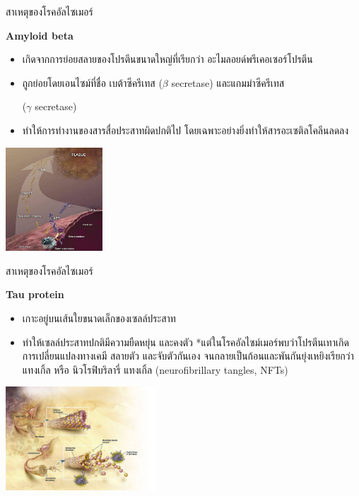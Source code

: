 \documentclass[xetex,serif]{beamer}
\begin{document}
\begin{frame}{สาเหตุของโรคอัลไซเมอร์}

  {\large \textbf{Amyloid beta}}

  \begin{itemize}
    \item เกิดจากการย่อยสลายของโปรตีนขนาดใหญ่ที่เรียกว่า อะไมลอยด์พรีเคอเซอร์โปรตีน
    \item ถูกย่อยโดยเอนไซม์ที่ชื่อ เบต้าซีครีเทส ($\beta$ secretase) และแกมม่าซีครีเทส
    
    ($\gamma$ secretase)
    \item ทำให้การทำงานของสารสื่อประสาทผิดปกติไป โดยเฉพาะอย่างยิ่งทำให้สารอะเซติลโคลีนลดลง  
  \end{itemize}
  \begin{center}
    \includegraphics[height=110pt]{img1.jpg}
  \end{center}
\end{frame}

\begin{frame}{สาเหตุของโรคอัลไซเมอร์}

  {\large \textbf{Tau protein}}

  \begin{itemize}
    \item เกาะอยู่บนเส้นใยขนาดเล็กของเซลล์ประสาท
    \item ทำให้เซลล์ประสาทปกติมีความยืดหยุ่น และคงตัว *แต่ในโรคอัลไซม์เมอร์พบว่าโปรตีนเทาเกิดการเปลี่ยนแปลงทางเคมี สลายตัว และจับตัวกันเอง จนกลายเป็นก้อนและพันกันยุ่งเหยิงเรียกว่า แทงเกิ้ล หรือ นิวโรฟิบริลารี่ แทงเกิ้ล (neurofibrillary tangles, NFTs) 
  \end{itemize}
  \begin{center}
    \includegraphics[height=110pt]{img2.jpg}
  \end{center}
\end{frame}
\end{document}
